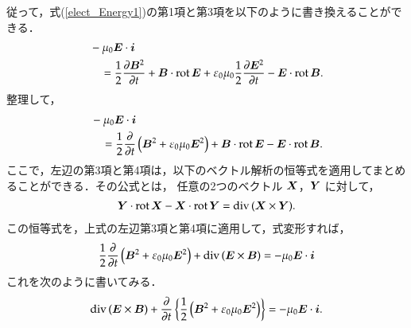         従って，式(\ref{elect_Energy1})の第1項と第3項を以下のように書き換えることができる．
                                \begin{align*}
                                &-\mu_{0}\boldsymbol{E}\cdot\boldsymbol{i} \notag \\
                                &\quad = \frac{1}{2} \frac{\partial \boldsymbol{B}^{2}}{ \partial t}
                                +\boldsymbol{B}\cdot\mathrm{rot\,} \boldsymbol{E}
                                +\varepsilon_{0}\mu_{0}\frac{1}{2} \frac{\partial \boldsymbol{E}^{2}}{ \partial t}
                                -\boldsymbol{E}\cdot\mathrm{rot\,}\boldsymbol{B}.
                                \end{align*}
        整理して，
                                \begin{align}
                                &-\mu_{0}\boldsymbol{E}\cdot\boldsymbol{i} \notag \\
                                &\quad = \frac{1}{2} \frac{\partial }{ \partial t}\left(\boldsymbol{B}^{2}
                                +\varepsilon_{0}\mu_{0}\boldsymbol{E}^{2}\right)
                                +\boldsymbol{B}\cdot\mathrm{rot\,} \boldsymbol{E}
                                -\boldsymbol{E}\cdot\mathrm{rot\,}\boldsymbol{B}.
                                \end{align}
        ここで，左辺の第3項と第4項は，以下のベクトル解析の恒等式を適用してまとめることができる．その公式とは，
        任意の2つのベクトル $\boldsymbol{X}$，$\boldsymbol{Y}$ に対して，
                                \begin{align}
                                \boldsymbol{Y}\cdot\mathrm{rot}\,\boldsymbol{X} - \boldsymbol{X}\cdot\mathrm{rot}\,\boldsymbol{Y} =\mathrm{div}\,(\boldsymbol{X}\times\boldsymbol{Y}).
                                \end{align}
        この恒等式を，上式の左辺第3項と第4項に適用して，式変形すれば，
                                \begin{align}\label{eq:EB_energy}
                                \frac{1}{2} \frac{\rd}{\rd t}\left(\bB^{2}
                                +\varepsilon_{0}\mu_{0}\bE^{2}\right)
                                +\ddiv(\bE\times\bB)
                                =-\mu_{0}\bE\cdot\bi
                                \end{align}
        これを次のように書いてみる．
                                \begin{align}
                                        \mathrm{div}\,(\boldsymbol{E}\times\boldsymbol{B})
                                        + \frac{\partial}{\partial t}
                                          \left\{\frac{1}{2}
                                            \left(
                                              \boldsymbol{B}^{2} + \varepsilon_{0}\mu_{0}\boldsymbol{E}^{2}
                                            \right)
                                          \right\}
                                        = -\mu_{0}\boldsymbol{E}\cdot\boldsymbol{i}.
                                \end{align}
